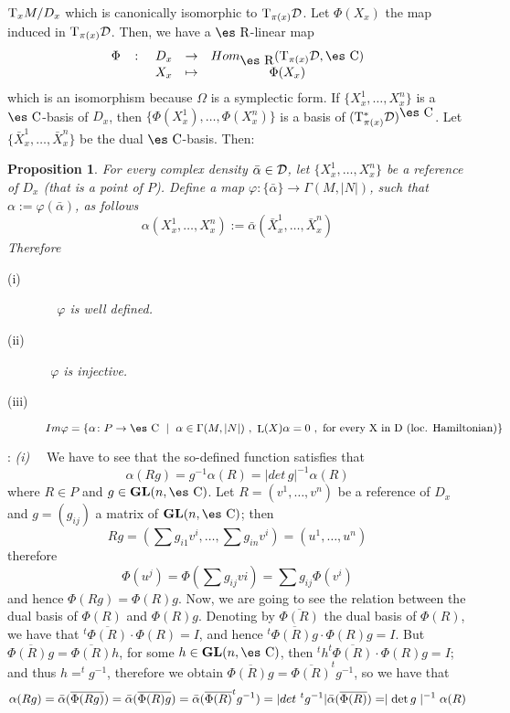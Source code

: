 \documentclass[12pt]{article}
\theoremstyle{plain}
\newtheorem{prop}{Proposition}
\def\GL{{\bf GL}(n,\Complex )}
\def\Real{\mbox{\es R}}
\def\Complex{\mbox{\es C}}
\def\Tan{{\rm T}}
\def\Lie{\mathop{\rm L}\nolimits}
\begin{document}
$\Tan_xM/D_x$ which is canonically isomorphic to $\Tan_{\pi (x)}{\cal
D}$.
Let $\Phi(X_x)$ the map induced in $\Tan_{\pi (x)}{\cal D}$.
Then, we have a $\Real$-linear map
$$
\begin{array}{ccccc}
\Phi & \colon & D_x & \to & Hom_{\Real}(\Tan_{\pi (x)}{\cal D},\Complex
)
\\
& & X_x & \mapsto & \Phi (X_x)
\end{array}
$$
which is an isomorphism because $\Omega$ is a symplectic form.
If $\{ X_x^1,\ldots ,X_x^n \}$ is a $\Complex$-basis of $D_x$, then
$\{ \Phi (X_x^1),\ldots ,\Phi (X_x^n) \}$ is a basis of
$(\Tan^*_{\pi (x)}{\cal D})^{\Complex}$.
 Let $\{ \bar X_x^1,\ldots ,\bar X_x^n \}$
be the dual $\Complex$-basis. Then:

\begin{prop}
For every complex density $\bar \alpha\in{\cal D}$,
let $\{ X_x^1,\ldots ,X_x^n \}$ be a reference of $D_x$ (that is a point
of $P$).
Define a map $\varphi\colon \{\bar\alpha\} \to \Gamma(M,| N |)$,
such that $\alpha :=\varphi (\bar \alpha)$, as follows
$$
\alpha (X_x^1,\ldots ,X_x^n) :=\bar \alpha (\bar X_x^1,\ldots ,\bar
X_x^n)
$$
Therefore
\begin{description}
\item[{\rm (i)}] \ \
$\varphi$ is well defined.
\item[{\rm (ii)}] \
$\varphi$ is injective.
\item[{\rm (iii)}]
$Im \varphi =\{ \alpha \colon P \to \Complex \ \mid \ \alpha \in
\Gamma(M,| N |) \ , \ \Lie(X)\alpha = 0 \ , \ \mbox{for every X in
D (loc. Hamiltonian)} \}$
\end{description}
\end{prop}
: 
{\it (i)} \ \
We have to see that the so-defined function satisfies that
$$
\alpha (Rg) = g^{-1} \alpha (R) =| det\, g |^{-1} \alpha (R)
$$
where $R \in P$ and $g \in \GL$. Let $R=(v^1,\ldots ,v^n)$ be
a reference of $D_x$ and $g=(g_{ij})$ a matrix of $\GL$; then
$$
Rg = (\sum g_{i1}v^i,\ldots ,\sum g_{in}v^i) = (u^1,\ldots ,u^n)
$$
therefore
$$
\Phi (u^j) = \Phi ( \sum g_{ij}vi) = \sum g_{ij} \Phi (v^i)
$$
and hence $\Phi (Rg) = \Phi (R) g$.
Now, we are going to see the relation between the dual basis of $\Phi
(R)$ and
$\Phi (R) g$. Denoting by $\overline {\Phi (R)}$
the dual basis of $\Phi(R)$, we have that $^t\overline {\Phi (R)} \cdot
\Phi (R) = I$, and hence
$^t\overline {\Phi (R) g} \cdot \Phi (R) g = I$.
But $\overline {\Phi (R) g} = \overline {\Phi (R)} h$,
for some $h \in \GL$, then $^th ^t\overline {\Phi (R)} \cdot \Phi (R) g
= I$;
and thus $h = ^tg^{-1}$, therefore we obtain
$\overline {\Phi (R) g} = \overline {\Phi (R)} ^tg^{-1}$, so we have
that
$$
\alpha (Rg)= \bar \alpha (\overline {\Phi (Rg)}) =
\bar \alpha (\overline {\Phi (R) g}) =
\bar \alpha (\overline {\Phi (R)}  ^tg^{-1}) =
| det \ ^tg^{-1} | \bar \alpha (\overline {\Phi (R)}) =
\mid {\rm det}\, g\mid^{-1} \alpha (R)
$$
\end{document}
